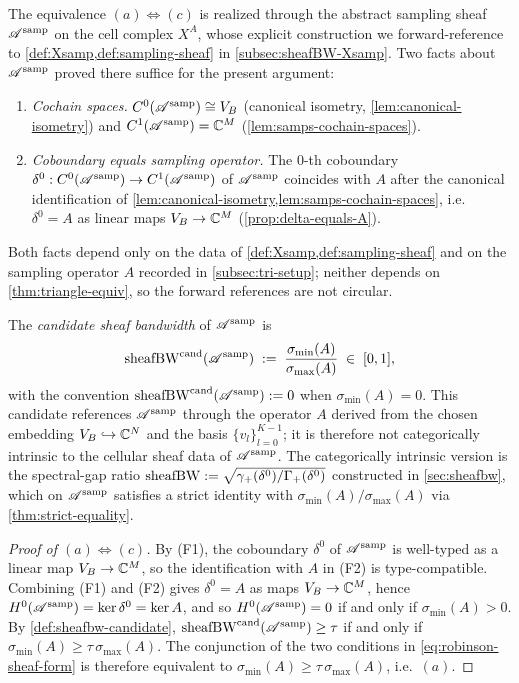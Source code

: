 The equivalence $(a) \Leftrightarrow (c)$ is realized through the
abstract sampling sheaf $\mathscr{A}^{\mathrm{samp}}$ on the cell complex $X^A$, whose
explicit construction we forward-reference to
\cref{def:Xsamp,def:sampling-sheaf} in
\cref{subsec:sheafBW-Xsamp}. Two facts about $\mathscr{A}^{\mathrm{samp}}$ proved there
suffice for the present argument:
\begin{enumerate}[label=\textup{(F\arabic*)},leftmargin=*]
  \item \emph{Cochain spaces.} $C^0(\mathscr{A}^{\mathrm{samp}}) \cong V_B$ (canonical
        isometry, \cref{lem:canonical-isometry}) and
        $C^1(\mathscr{A}^{\mathrm{samp}}) = \mathbb{C}^M$
        (\cref{lem:samps-cochain-spaces}).
  \item \emph{Coboundary equals sampling operator.} The $0$-th
        coboundary $\delta^0 : C^0(\mathscr{A}^{\mathrm{samp}}) \to C^1(\mathscr{A}^{\mathrm{samp}})$ of
        $\mathscr{A}^{\mathrm{samp}}$ coincides with $A$ after the canonical
        identification of \cref{lem:canonical-isometry,lem:samps-cochain-spaces},
        i.e.\ $\delta^0 = A$ as linear maps $V_B \to \mathbb{C}^M$
        (\cref{prop:delta-equals-A}).
\end{enumerate}
Both facts depend only on the data of \cref{def:Xsamp,def:sampling-sheaf}
and on the sampling operator $A$ recorded in \cref{subsec:tri-setup};
neither depends on \cref{thm:triangle-equiv}, so the forward
references are not circular.

\begin{definition}\label{def:sheafbw-candidate}
The \emph{candidate sheaf bandwidth} of $\mathscr{A}^{\mathrm{samp}}$ is
\begin{equation}\label{eq:sheafbw-candidate}
  \operatorname{sheafBW}^{\mathrm{cand}}(\mathscr{A}^{\mathrm{samp}})
  \;:=\;
  \frac{\sigma_{\min}(A)}{\sigma_{\max}(A)}
  \;\in\;
  [0, 1],
\end{equation}
with the convention
$\operatorname{sheafBW}^{\mathrm{cand}}(\mathscr{A}^{\mathrm{samp}}) := 0$ when
$\sigma_{\min}(A) = 0$. This candidate references $\mathscr{A}^{\mathrm{samp}}$ through
the operator $A$ derived from the chosen embedding
$V_B \hookrightarrow \mathbb{C}^N$ and the basis $\{v_l\}_{l=0}^{K-1}$; it is
therefore not categorically intrinsic to the cellular sheaf data of
$\mathscr{A}^{\mathrm{samp}}$. The categorically intrinsic version is the spectral-gap
ratio
$\operatorname{sheafBW} := \sqrt{\gamma_+(\delta^0) / \Gamma_+(\delta^0)}$
constructed in \cref{sec:sheafbw}, which on $\mathscr{A}^{\mathrm{samp}}$ satisfies a
strict identity with $\sigma_{\min}(A) / \sigma_{\max}(A)$ via
\cref{thm:strict-equality}.
\end{definition}

\begin{proof}[Proof of $(a) \Leftrightarrow (c)$]
By \textup{(F1)}, the coboundary $\delta^0$ of $\mathscr{A}^{\mathrm{samp}}$ is well-typed
as a linear map $V_B \to \mathbb{C}^M$, so the identification with $A$ in
\textup{(F2)} is type-compatible. Combining \textup{(F1)} and
\textup{(F2)} gives $\delta^0 = A$ as maps $V_B \to \mathbb{C}^M$, hence
$H^0(\mathscr{A}^{\mathrm{samp}}) = \ker \delta^0 = \ker A$, and so
$H^0(\mathscr{A}^{\mathrm{samp}}) = 0$ if and only if $\sigma_{\min}(A) > 0$. By
\cref{def:sheafbw-candidate},
$\operatorname{sheafBW}^{\mathrm{cand}}(\mathscr{A}^{\mathrm{samp}}) \ge \tau$ if and only if
$\sigma_{\min}(A) \ge \tau \, \sigma_{\max}(A)$. The conjunction of
the two conditions in \cref{eq:robinson-sheaf-form} is therefore
equivalent to $\sigma_{\min}(A) \ge \tau \, \sigma_{\max}(A)$, i.e.\
$(a)$.
\end{proof}

